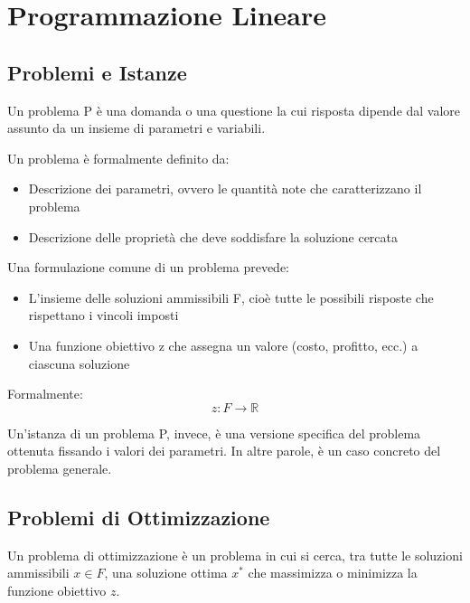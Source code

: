 



\chapter{Programmazione Lineare}





\section{Problemi e Istanze}


Un problema P è una domanda o una questione la cui risposta dipende dal valore assunto da un insieme di parametri e variabili.





Un problema è formalmente definito da:


\begin{itemize}


    \item Descrizione dei parametri, ovvero le quantità note che caratterizzano il problema


    \item Descrizione delle proprietà che deve soddisfare la soluzione cercata


\end{itemize}





Una formulazione comune di un problema prevede:


\begin{itemize}
    \item L'insieme delle soluzioni ammissibili F, cioè tutte le possibili risposte che rispettano i vincoli imposti
    \item Una funzione obiettivo z che assegna un valore (costo, profitto, ecc.) a ciascuna soluzione
\end{itemize}

Formalmente:
\[
z \colon F \rightarrow \mathbb{R}
\]

Un'istanza di un problema P, invece, è una versione specifica del problema ottenuta fissando i valori dei parametri. In altre parole, è un caso concreto del problema generale.

\section{Problemi di Ottimizzazione}
Un problema di ottimizzazione è un problema in cui si cerca, tra tutte le soluzioni ammissibili $x \in F$, una soluzione ottima $x^*$ che massimizza o minimizza la funzione obiettivo $z$.

